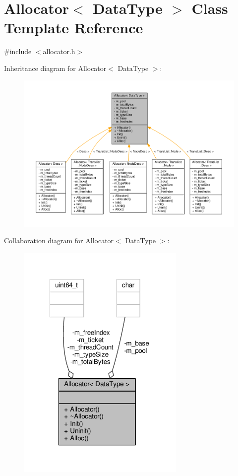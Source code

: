 \hypertarget{classAllocator}{\section{Allocator$<$ Data\-Type $>$ Class Template Reference}
\label{classAllocator}
}


{\ttfamily \#include $<$allocator.\-h$>$}



Inheritance diagram for Allocator$<$ Data\-Type $>$\-:
\nopagebreak
\begin{figure}[H]
\begin{center}
\leavevmode
\includegraphics[width=350pt]{classAllocator__inherit__graph}
\end{center}
\end{figure}


Collaboration diagram for Allocator$<$ Data\-Type $>$\-:
\nopagebreak
\begin{figure}[H]
\begin{center}
\leavevmode
\includegraphics[width=230pt]{classAllocator__coll__graph}
\end{center}
\end{figure}
